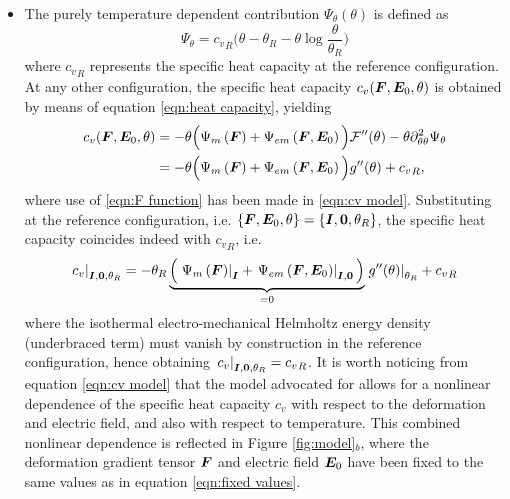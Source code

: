 \begin{itemize}
\item The purely temperature dependent contribution $\Psi_{\theta}(\theta)$ is defined as
%
\begin{equation}
\Psi_{\theta}=  {c_v}_R\Big(\theta - \theta_R - \theta \log \frac{\theta}{\theta_R}\Big)
\end{equation}
%
where ${c_v}_R$ represents the specific heat capacity at the reference configuration. At any other configuration, the specific heat capacity $c_v(\boldsymbol{F},\boldsymbol{E}_0,\theta)$ is obtained by means of equation \eqref{eqn:heat capacity}, yielding
%
\begin{equation}\label{eqn:cv model}
\begin{aligned}	
c_v(\vect{F},\vect{E}_0,\theta)&=-\theta\Big({\Psi}_{m}\left(\vect{F}\right)+{\Psi}_{em}\left(\vect{F},\vect{E}_0\right)\Big)\mathcal{F}^{\prime\prime}(\theta) - \theta\partial_{\theta\theta}^2\Psi_{\theta}\\
%
&=-\theta\Big({\Psi}_{m}\left(\vect{F}\right)+{\Psi}_{em}\left(\vect{F},\vect{E}_0\right)\Big)g^{\prime\prime}(\theta) + {c_v}_R,
\end{aligned}
\end{equation}
%
where use of \eqref{eqn:F function} has been made in \eqref{eqn:cv model}. Substituting at the reference configuration, i.e. $\{\boldsymbol{F},\boldsymbol{E}_0,\theta\}=\{\boldsymbol{I},\boldsymbol{0},\theta_R\}$, the specific heat capacity coincides indeed with ${c_v}_R$, i.e.
%
\begin{equation}
\left.c_v\right\vert_{\boldsymbol{I},\boldsymbol{0},\theta_R}=-\theta_R\underbrace{\Big(\left.{\Psi}_{m}\left(\boldsymbol{F}\right)\right\vert_{\boldsymbol{I}}+\left.{\Psi}_{em}\left(\boldsymbol{F},\boldsymbol{E}_0\right)\right\vert_{\boldsymbol{I},\boldsymbol{0}}\Big)}_{=0}\left.{g}^{\prime\prime}(\theta)\right\vert_{\theta_R} + {c_v}_R
\end{equation}
%
where the isothermal electro-mechanical Helmholtz energy density (underbraced term) must vanish by construction in the reference configuration, hence obtaining $\left.c_v\right\vert_{\boldsymbol{I},\boldsymbol{0},\theta_R}={c_v}_R$. It is worth noticing from equation \eqref{eqn:cv model} that the model advocated for allows for a nonlinear dependence of the specific heat capacity $c_v$  with respect to the deformation and electric field, and also with respect to temperature. This combined nonlinear dependence is reflected in Figure \ref{fig:model}$_b$, where the deformation gradient tensor $\boldsymbol{F}$ and electric field $\boldsymbol{E}_0$ have been fixed to the same values as in equation \eqref{eqn:fixed values}.

\end{itemize}



